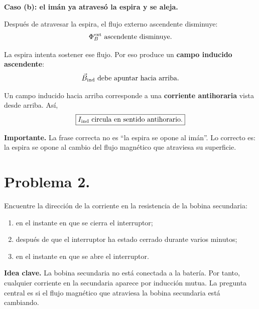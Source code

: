 \documentclass[11pt]{article}
\newcommand{\ideaclave}[1]{%
  \par\medskip
  \noindent\textbf{Idea clave.} #1\par
}
\newcommand{\importante}[1]{%
  \par\medskip
  \noindent\textbf{Importante.} #1\par
}
\newcommand{\paso}[1]{%
  \par\medskip
  \noindent\textbf{#1}\par
  \vspace{0.1em}%
}
\begin{document}
\paso{Caso (b): el im\'an ya atraves\'o la espira y se aleja.}
Despu\'es de atravesar la espira, el flujo externo ascendente disminuye:
\begin{equation*}
    \Phi_B^{\rm ext}\ \text{ascendente disminuye}.
\end{equation*}

La espira intenta sostener ese flujo. Por eso produce un \textbf{campo inducido ascendente}:
\begin{equation*}
    \vec B_{\rm ind}\ \text{debe apuntar hacia arriba}.
\end{equation*}

Un campo inducido hacia arriba corresponde a una \textbf{corriente antihoraria} vista desde arriba. As\'i,
\begin{equation*}
    \boxed{I_{\rm ind}\ \text{circula en sentido antihorario}.}
\end{equation*}

\importante{La frase correcta no es ``la espira se opone al im\'an''. Lo correcto es: la espira se opone al cambio del flujo magn\'etico que atraviesa su superficie.}


\clearpage

\section*{Problema 2.}
Encuentre la direcci\'on de la corriente en la resistencia de la bobina secundaria:
\begin{enumerate}[label=(\alph*)]
    \item en el instante en que se cierra el interruptor;
    \item despu\'es de que el interruptor ha estado cerrado durante varios minutos;
    \item en el instante en que se abre el interruptor.
\end{enumerate}

\ideaclave{La bobina secundaria no est\'a conectada a la bater\'ia. Por tanto, cualquier corriente en la secundaria aparece por inducci\'on mutua. La pregunta central es si el flujo magn\'etico que atraviesa la bobina secundaria est\'a cambiando.}
\end{document}
